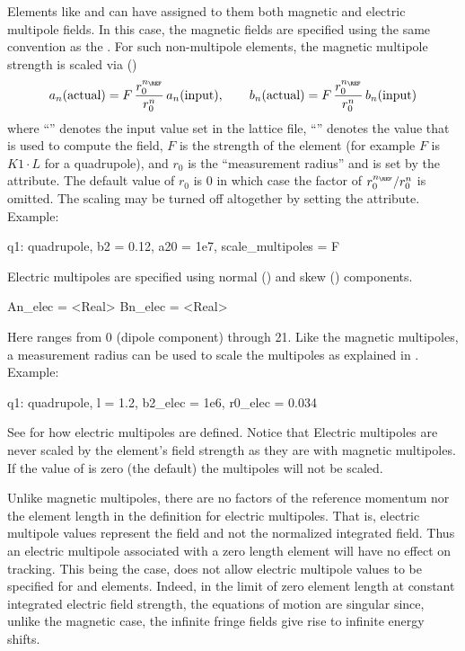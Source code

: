 Elements like  and  can have assigned to them both magnetic and
electric multipole fields. In this case, the magnetic fields are specified using the same convention
as the .  For such non-multipole elements, the magnetic multipole strength is
scaled via () 
\begin{equation}
a_n(\text{actual}) = F \, \frac{r_0^{n_\REF}}{r_0^n} \, a_n(\text{input}), \qquad
b_n(\text{actual}) = F \, \frac{r_0^{n_\REF}}{r_0^n} \, b_n(\text{input})
\end{equation}
where ``'' denotes the input value set in the lattice file, ``'' denotes the
value that is used to compute the field, $F$ is the strength of the element (for example $F$ is $K1 \cdot
L$ for a quadrupole), and $r_0$ is the ``measurement radius'' and is set by the 
attribute. The default value of $r_0$ is 0 in which case the factor of $r_0^{n_\REF}/r_0^n$ is
omitted. The scaling may be turned off altogether by setting the  attribute.
Example:
\begin{example}
  q1: quadrupole, b2 = 0.12, a20 = 1e7, scale_multipoles = F
\end{example}

Electric multipoles are specified using normal () and skew
() components. \begin{example}
  An_elec = <Real>
  Bn_elec = <Real>
\end{example}
Here  ranges from 0 (dipole component) through 21. Like the magnetic multipoles, a measurement
radius  can be used to scale the multipoles as explained in .
Example:
\begin{example}
  q1: quadrupole, l = 1.2, b2_elec = 1e6, r0_elec = 0.034
\end{example}
See  for how electric multipoles are defined. Notice that Electric multipoles are
never scaled by the element's field strength as they are with magnetic multipoles. If the value of
 is zero (the default) the multipoles will not be scaled.

Unlike magnetic multipoles, there are no factors of the reference momentum nor the element length in
the definition for electric multipoles. That is, electric multipole values represent the field and
not the normalized integrated field. Thus an electric multipole associated with a zero length
element will have no effect on tracking. This being the case, \bmad does not allow electric
multipole values to be specified for  and  elements. Indeed, in the
limit of zero element length at constant integrated electric field strength, the equations of motion
are singular since, unlike the magnetic case, the infinite fringe fields give rise to infinite
energy shifts.

